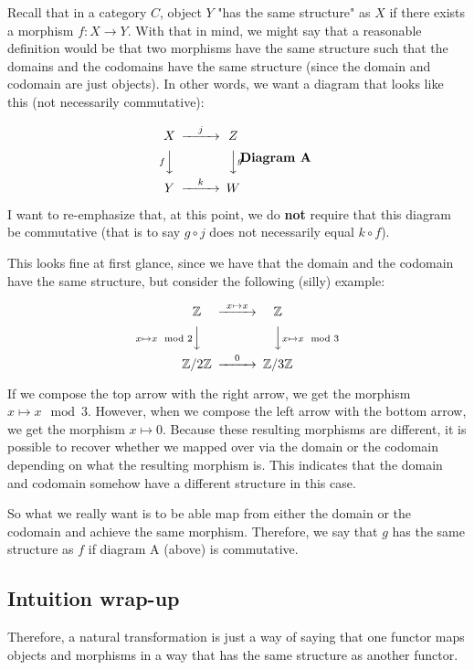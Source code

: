 \documentclass[11pt]{article}
\begin{document}
Recall that in a category \(C\), object \(Y\) "has the same structure" as \(X\) if there exists a morphism \(f: X\to Y\). With that in mind, we might say that a reasonable definition would be that two
morphisms have the same structure such that the domains and the codomains have the same structure (since the domain and codomain are just objects). In other words,
we want a diagram that looks like this (not necessarily commutative):

\[\begin{CD}
X    @>j>> Z \\
@VfVV      @VVgV \\
Y    @>k>> W
\end{CD}

\textbf{Diagram A}\]

I want to re-emphasize that, at this point, we do \textbf{not} require that this diagram be commutative (that is to say \(g\circ j\) does not necessarily equal \(k\circ f\)).

This looks fine at first glance, since we have that the domain and the codomain have the same structure, but consider the following (silly) example:

\[\begin{CD}
\mathbb{Z}              @>x\mapsto x>> \mathbb{Z} \\
@Vx\mapsto x\mod 2VV                   @VVx\mapsto x\mod 3V \\
\mathbb{Z}/ 2\mathbb{Z} @>0>>          \mathbb{Z}/ 3\mathbb{Z}
\end{CD} \]

If we compose the top arrow with the right arrow, we get the morphism \(x\mapsto x\mod 3\). However, when we compose the left arrow with the bottom arrow, we get the morphism \(x\mapsto 0\).
Because these resulting morphisms are different, it is possible to recover whether we mapped over via the domain or the codomain depending on what the resulting morphism is.
This indicates that the domain and codomain somehow have a different structure in this case.

So what we really want is to be able map from either the domain or the codomain and achieve the same morphism. Therefore, we say that \(g\) has the same structure as \(f\) if diagram A (above)
is commutative.

\subsection*{Intuition wrap-up}
\label{sec:org894c22d}
Therefore, a natural transformation is just a way of saying that one functor maps objects and morphisms in a way that has the same structure as another functor.
\end{document}
